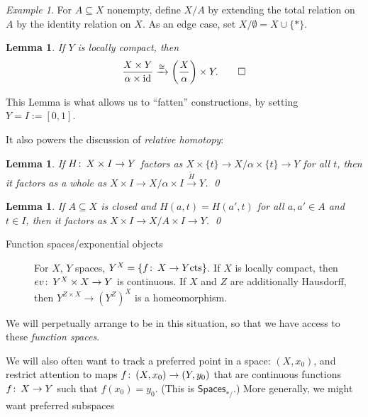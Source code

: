 \documentclass{amsart}
\newcommand{\CatOf}[1]{\mathsf{#1}}
\newcommand{\define}[1]{\textit{#1}}
\newcommand{\co}{\colon\thinspace}
\DeclareMathOperator{\id}{id}
\theoremstyle{plain}
\newtheorem{lemma}[dummy]{Lemma}
\theoremstyle{definition}
\theoremstyle{remark}
\newtheorem{example}[dummy]{Example}
\begin{document}
\begin{example}
For $A \subseteq X$ nonempty, define $X/A$ by extending the total relation on $A$ by the identity relation on $X$.  As an edge case, set $X / \emptyset = X \cup \{*\}$.
\end{example}

\begin{lemma}
If $Y$ is locally compact, then \[\frac{X \times Y}{\alpha \times \id} \xrightarrow{\cong} \left( \frac{X}{\alpha}\right) \times Y. \qed\]
\end{lemma}

This Lemma is what allows us to ``fatten'' constructions, by setting $Y = I := [0, 1]$.

It also powers the discussion of \define{relative homotopy}:
\begin{lemma}
If $H\co X \times I \to Y$ factors as $X \times \{t\} \to X/\alpha \times \{t\} \to Y$ for all $t$, then it factors as a whole as $X \times I \to X/\alpha \times I \xrightarrow{\widetilde H} Y$. \qed
\end{lemma}

\begin{lemma}
If $A \subseteq X$ is closed and $H(a, t) = H(a', t)$ for all $a, a' \in A$ and $t \in I$, then it factors as $X \times I \to X/A \times I \to Y$. \qed
\end{lemma}

\begin{description}
	\item[Function spaces/exponential objects] For $X$, $Y$ spaces, $Y^X = \{f\co X \to Y \text{cts}\}$.  If $X$ is locally compact, then $ev\co Y^X \times X \to Y$ is continuous.  If $X$ and $Z$ are additionally Hausdorff, then $Y^{Z \times X} \to (Y^Z)^X$ is a homeomorphism.
\end{description}

We will perpetually arrange to be in this situation, so that we have access to these \define{function spaces}.

We will also often want to track a preferred point in a space: $(X, x_0)$, and restrict attention to maps $f\co (X, x_0) \to (Y, y_0)$ that are continuous functions $f\co X \to Y$ such that $f(x_0) = y_0$.  (This is $\CatOf{Spaces}_{*/}$.)  More generally, we might want preferred subspaces
\begin{center}
\end{center}
\end{document}

